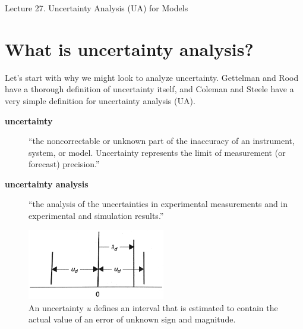 \documentclass[10pt]{article}
\begin{document}
   \noindent
   \begin{center}

   \hrulefill
   
   \vspace{5pt}
   
   \vspace{0pt}
   
   {\Large \hfill  Lecture 27.  
Uncertainty Analysis (UA) for Models
}
   \vspace{5pt}
   
  
   \hrulefill
   \end{center}
   
   {}


\section{What is uncertainty analysis?}
Let's start with why we might look to analyze uncertainty. Gettelman and Rood have a thorough definition of uncertainty itself, and Coleman and Steele have a very simple definition for uncertainty analysis (UA).

\begin{description}
\item [\textbf{uncertainty}] ``the noncorrectable or unknown part of the inaccuracy of an instrument, system, or model. Uncertainty represents the limit of measurement (or forecast) precision.''\cite{Gettelman2016-my}
\item [\textbf{uncertainty analysis}] ``the analysis of the uncertainties in experimental measurements and in experimental and simulation results.''\cite{Coleman2009-wb}
\end{description}

\medskip
            \begin{figure}[h]
            \centering
            \includegraphics[width=6cm]{extras27/u}
            \caption{An uncertainty \textit{u} defines an interval that is estimated to contain the actual value of an error of unknown sign and magnitude. \cite{Coleman2009-wb}}
            \label{coleman1.3}
            \end{figure}
\bigskip
\end{document}
